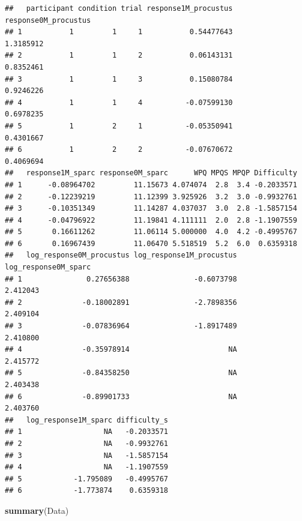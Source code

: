 \documentclass[
]{article}
\newenvironment{Shaded}{\begin{snugshade}}{\end{snugshade}}
\newcommand{\FunctionTok}[1]{\textcolor[rgb]{0.13,0.29,0.53}{\textbf{#1}}}
\newcommand{\NormalTok}[1]{#1}
\begin{document}
\begin{verbatim}
##   participant condition trial response1M_procustus response0M_procustus
## 1           1         1     1           0.54477643            1.3185912
## 2           1         1     2           0.06143131            0.8352461
## 3           1         1     3           0.15080784            0.9246226
## 4           1         1     4          -0.07599130            0.6978235
## 5           1         2     1          -0.05350941            0.4301667
## 6           1         2     2          -0.07670672            0.4069694
##   response1M_sparc response0M_sparc      WPQ MPQS MPQP Difficulty
## 1      -0.08964702         11.15673 4.074074  2.8  3.4 -0.2033571
## 2      -0.12239219         11.12399 3.925926  3.2  3.0 -0.9932761
## 3      -0.10351349         11.14287 4.037037  3.0  2.8 -1.5857154
## 4      -0.04796922         11.19841 4.111111  2.0  2.8 -1.1907559
## 5       0.16611262         11.06114 5.000000  4.0  4.2 -0.4995767
## 6       0.16967439         11.06470 5.518519  5.2  6.0  0.6359318
##   log_response0M_procustus log_response1M_procustus log_response0M_sparc
## 1               0.27656388               -0.6073798             2.412043
## 2              -0.18002891               -2.7898356             2.409104
## 3              -0.07836964               -1.8917489             2.410800
## 4              -0.35978914                       NA             2.415772
## 5              -0.84358250                       NA             2.403438
## 6              -0.89901733                       NA             2.403760
##   log_response1M_sparc difficulty_s
## 1                   NA   -0.2033571
## 2                   NA   -0.9932761
## 3                   NA   -1.5857154
## 4                   NA   -1.1907559
## 5            -1.795089   -0.4995767
## 6            -1.773874    0.6359318
\end{verbatim}

\begin{Shaded}
\begin{Highlighting}[]
\FunctionTok{summary}\NormalTok{(Data)}
\end{Highlighting}
\end{Shaded}
\end{document}
